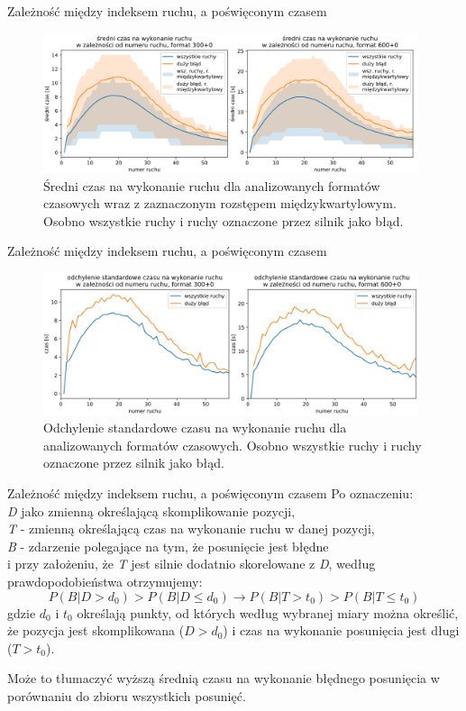 \documentclass{beamer}
\begin{document}
\begin{frame}{Zależność między indeksem ruchu, a poświęconym czasem}
	\begin{figure}[H]
		\centering
		\includegraphics[width=11cm]{../Formatka/sr_czas_na_ruch.png}
		\caption{Średni czas na wykonanie ruchu dla analizowanych formatów czasowych wraz z zaznaczonym rozstępem międzykwartylowym. Osobno wszystkie ruchy i ruchy oznaczone przez silnik jako błąd.}
		\label{rys:sr_czas_na_ruch}
	\end{figure}
\end{frame}
\begin{frame}{Zależność między indeksem ruchu, a poświęconym czasem}
	\begin{figure}[H]
		\centering
		\includegraphics[width=11cm]{../Formatka/std_czas_na_ruch.png}
		\caption{Odchylenie standardowe czasu na wykonanie ruchu dla analizowanych formatów czasowych. Osobno wszystkie ruchy i ruchy oznaczone przez silnik jako błąd.}
		\label{rys:std_czas_na_ruch}
	\end{figure}
\end{frame}
\begin{frame}{Zależność między indeksem ruchu, a poświęconym czasem}
	Po oznaczeniu:\\ 
	\textit{D} jako zmienną określającą skomplikowanie pozycji,\\ \textit{T} - zmienną określającą czas na wykonanie ruchu w danej pozycji,\\ \textit{B} - zdarzenie polegające na tym, że posunięcie jest błędne\\
	 i przy założeniu, że \textit{T} jest silnie dodatnio skorelowane z \textit{D}, według prawdopodobieństwa otrzymujemy:
	\begin{equation*}
		P(B|D>d_0) > P(B|D\leq d_0) \rightarrow P(B|T>t_0) > P(B|T\leq t_0)
	\end{equation*}
	gdzie $d_0$ i $t_0$ określają punkty, od których według wybranej miary można określić, że pozycja jest skomplikowana ($D>d_0$) i czas na wykonanie posunięcia jest długi ($T>t_0$).
	
	
	Może to tłumaczyć wyższą średnią czasu na wykonanie błędnego posunięcia w porównaniu do zbioru wszystkich posunięć.
\end{frame}
\end{document}
